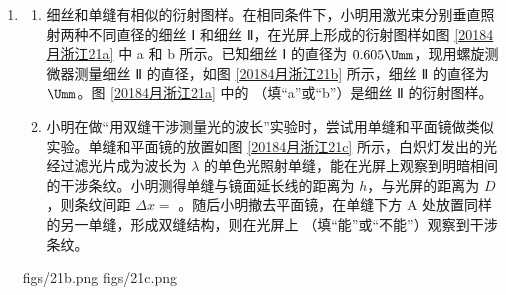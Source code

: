 \documentclass[\gkver]{gaokaozhenti}
\begin{document}
\begin{enumerate}
{	（4）小球从 C 至 P 运动的时间，由运动学公式得 $t_{0}=\sqrt{\frac{2h}{g}}=0.8\Us$；与地面碰撞后，小球的机械能损失 75\%，即动能损失 75\%，即水平与竖直方向的动能均损失 75\%，故竖直方向的速度为碰撞前的一半，因此从 P 点弹起到小球第 1 次落地的时间为 $t_{1}=\frac{1}{2}\times2t_{0}=0.8\Us$，从 P 点弹起到小球第 2 次落地的时间为 $t_{2}=\frac{1}{2}\times t_{1}$，$\cdots\cdots$，从 P 点弹起后，小球第 $n$ 次落地时间为 $t_{n}=\left(\frac{1}{2}\right)^{n-1}\times t_{1}$，故小球最后静止时经历的时间为 $t=t_{0}+t_{1}+t_{2}+\cdots+t_{n}=2.4\Us$。
}

\item
\begin{enumerate}
	\item
	细丝和单缝有相似的衍射图样。在相同条件下，小明用激光束分别垂直照射两种不同直径的细丝 Ⅰ 和细丝 Ⅱ，在光屏上形成的衍射图样如图 \ref{20184月浙江21a} 中 a 和 b 所示。已知细丝 Ⅰ 的直径为 $0.605\Umm$，现用螺旋测微器测量细丝 Ⅱ 的直径，如图 \ref{20184月浙江21b} 所示，细丝 Ⅱ 的直径为 $\Umm$。图 \ref{20184月浙江21a} 中的 （填“a”或“b”）是细丝 Ⅱ 的衍射图样。
	\item
	小明在做“用双缝干涉测量光的波长”实验时，尝试用单缝和平面镜做类似实验。单缝和平面镜的放置如图 \ref{20184月浙江21c} 所示，白炽灯发出的光经过滤光片成为波长为 $\lambda$ 的单色光照射单缝，能在光屏上观察到明暗相间的干涉条纹。小明测得单缝与镜面延长线的距离为 $h$，与光屏的距离为 $D$，则条纹间距 $\Delta x=$ 。随后小明撤去平面镜，在单缝下方 A 处放置同样的另一单缝，形成双缝结构，则在光屏上 （填“能”或“不能”）观察到干涉条纹。
\end{enumerate}
{figs/21b.png}
{figs/21c.png}
\end{enumerate}
\end{document}
